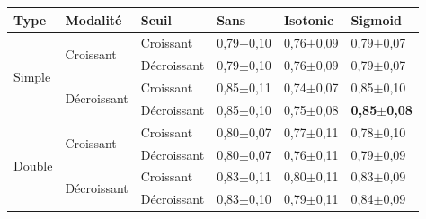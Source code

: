 \begin{table}[H]
    \begin{tabular}{llllll}
        \toprule 
        Type                    & Modalité                          & Seuil             & Sans                  & Isotonic              & Sigmoid               \\ \midrule
        \multirow{4}{*}{Simple} & \multirow{2}{*}{Croissant}        & Croissant         & 0,79$\pm$0,10         & 0,76$\pm$0,09         & 0,79$\pm$0,07         \\ \cline{3-6}
                                &                                   & Décroissant       & 0,79$\pm$0,10         & 0,76$\pm$0,09         & 0,79$\pm$0,07         \\ \cline{2-6}
                                & \multirow{2}{*}{Décroissant}      & Croissant         & 0,85$\pm$0,11         & 0,74$\pm$0,07         & 0,85$\pm$0,10         \\ \cline{3-6}
                                &                                   & Décroissant       & 0,85$\pm$0,10         & 0,75$\pm$0,08         & \textbf{0,85$\pm$0,08}\\ \cline{1-6}
        \multirow{4}{*}{Double} & \multirow{2}{*}{Croissant}        & Croissant         & 0,80$\pm$0,07         & 0,77$\pm$0,11         & 0,78$\pm$0,10         \\ \cline{3-6}
                                &                                   & Décroissant       & 0,80$\pm$0,07         & 0,76$\pm$0,11         & 0,79$\pm$0,09         \\ \cline{2-6}
                                & \multirow{2}{*}{Décroissant}      & Croissant         & 0,83$\pm$0,11         & 0,80$\pm$0,11         & 0,83$\pm$0,09         \\ \cline{3-6}
                                &                                   & Décroissant       & 0,83$\pm$0,10         & 0,79$\pm$0,11         & 0,84$\pm$0,09         \\ \bottomrule    
    \end{tabular}
\end{table}


